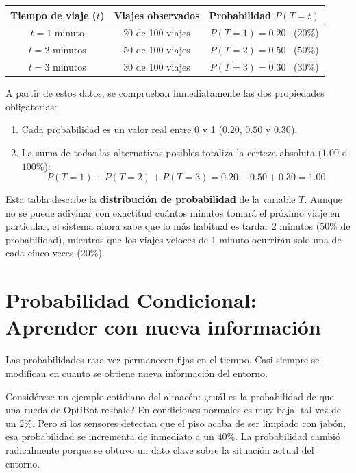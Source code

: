 \begin{center}
\begin{tabular}{ccc}
  \toprule
  \textbf{Tiempo de viaje ($t$)} & \textbf{Viajes observados} & \textbf{Probabilidad $P(T = t)$} \\
  \midrule
  $t = 1$ minuto  & 20 de 100 viajes & $P(T = 1) = 0.20$ \ ($20\%$) \\
  $t = 2$ minutos & 50 de 100 viajes & $P(T = 2) = 0.50$ \ ($50\%$) \\
  $t = 3$ minutos & 30 de 100 viajes & $P(T = 3) = 0.30$ \ ($30\%$) \\
  \bottomrule
\end{tabular}
\end{center}

A partir de estos datos, se comprueban inmediatamente las dos propiedades obligatorias:
\begin{enumerate}
  \item Cada probabilidad es un valor real entre 0 y 1 ($0.20$, $0.50$ y $0.30$).
  \item La suma de todas las alternativas posibles totaliza la certeza absoluta ($1.00$ o $100\%$):
  \begin{equation*}
    P(T = 1) + P(T = 2) + P(T = 3) = 0.20 + 0.50 + 0.30 = 1.00
  \end{equation*}
\end{enumerate}

Esta tabla describe la \textbf{distribución de probabilidad} de la variable $T$. Aunque no se puede adivinar con exactitud cuántos minutos tomará el próximo viaje en particular, el sistema ahora sabe que lo más habitual es tardar 2 minutos ($50\%$ de probabilidad), mientras que los viajes veloces de 1 minuto ocurrirán solo una de cada cinco veces ($20\%$).

\section{Probabilidad Condicional: Aprender con nueva información}
Las probabilidades rara vez permanecen fijas en el tiempo. Casi siempre se modifican en cuanto se obtiene nueva información del entorno.

Considérese un ejemplo cotidiano del almacén: ¿cuál es la probabilidad de que una rueda de OptiBot resbale? En condiciones normales es muy baja, tal vez de un $2\%$. Pero si los sensores detectan que el piso acaba de ser limpiado con jabón, esa probabilidad se incrementa de inmediato a un $40\%$. La probabilidad cambió radicalmente porque se obtuvo un dato clave sobre la situación actual del entorno.

